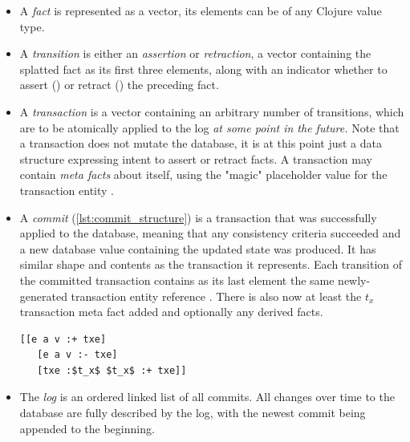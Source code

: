 \begin{itemize}
\item A \emph{fact} is represented as a vector, its elements can be of any Clojure value type.

\begin{center}
  \lisp{[e a v]}
\end{center}

\item A \emph{transition} is either an \emph{assertion} or \emph{retraction}, a vector containing the splatted fact as its first three elements, along with an indicator whether to assert (\lisp{:+}) or retract (\lisp{:-}) the preceding fact.

\begin{center}
  \lisp{[e a v :+]}
\end{center}

\item A \emph{transaction} is a vector containing an arbitrary number of transitions, which are to be atomically applied to the log \emph{at some point in the future.} Note that a transaction does not mutate the database, it is at this point just a data structure expressing intent to assert or retract facts. A transaction may contain \emph{meta facts} about itself, using the "magic" placeholder value for the transaction entity .

\begin{center}
  \lisp{[[e a v :-] [e a v :+] [:tx-meta a v :+]]}
\end{center}


\item A \emph{commit} (\autoref{lst:commit_structure}) is a transaction that was successfully applied to the database, meaning that any consistency criteria succeeded and a new database value containing the updated state was produced. It has similar shape and contents as the transaction it represents. Each transition of the committed transaction contains as its last element the same newly-generated transaction entity reference . There is also now at least the $t_x$ transaction meta fact added and optionally any derived facts.

\begin{lstlisting}[label={lst:commit_structure},morekeywords={:+,:-,txe},caption=Structure of a commit]
  [[e a v :+ txe]
   [e a v :- txe]
   [txe :$t_x$ $t_x$ :+ txe]]
\end{lstlisting}

\item The \emph{log} is an ordered linked list of all commits. All changes over time to the database are fully described by the log, with the newest commit being appended to the beginning.


\end{itemize}

